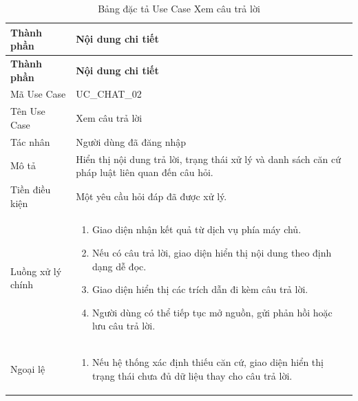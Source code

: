 \documentclass[12pt,a4paper,oneside]{report}
\begin{document}
{
  \begin{longtable}{|L{3.6cm}|L{11.2cm}|}
    \caption{Bảng đặc tả Use Case Xem câu trả lời}\label{tab:uc-chat-answer}                                                         \\
    \hline
    \textbf{Thành phần} & \textbf{Nội dung chi tiết}                                                                                   \\
    \hline
    \endfirsthead
    \hline
    \textbf{Thành phần} & \textbf{Nội dung chi tiết}                                                                                   \\
    \hline
    \endhead
    Mã Use Case       & UC\_CHAT\_02                                                                                                 \\
    \hline
    Tên Use Case      & Xem câu trả lời                                                                                              \\
    \hline
    Tác nhân            & Người dùng đã đăng nhập                                                                                      \\
    \hline
    Mô tả               & Hiển thị nội dung trả lời, trạng thái xử lý và danh sách căn cứ pháp luật liên quan đến câu hỏi.             \\
    \hline
    Tiền điều kiện      & Một yêu cầu hỏi đáp đã được xử lý.                                                                           \\
    \hline
    Luồng xử lý chính   & \begin{enumerate}[leftmargin=*,nosep]
                            \item Giao diện nhận kết quả từ dịch vụ phía máy chủ.
                            \item Nếu có câu trả lời, giao diện hiển thị nội dung theo định dạng dễ đọc.
                            \item Giao diện hiển thị các trích dẫn đi kèm câu trả lời.
                            \item Người dùng có thể tiếp tục mở nguồn, gửi phản hồi hoặc lưu câu trả lời.
                          \end{enumerate}                                 \\
    \hline
    Ngoại lệ            & \begin{enumerate}[leftmargin=*,nosep]
                            \item Nếu hệ thống xác định thiếu căn cứ, giao diện hiển thị trạng thái chưa đủ dữ liệu thay cho câu trả lời.

\end{enumerate}
\end{longtable}}
\end{document}
